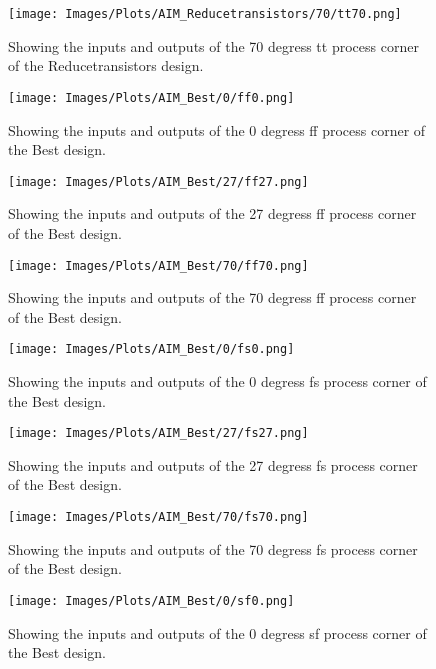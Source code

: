 \begin{figure}[htb] 
    \centering
    \texttt{[image: Images/Plots/AIM\_Reducetransistors/70/tt70.png]} 
    \caption{Showing the inputs and outputs of the 70 degress tt process corner of the Reducetransistors design.} 
    \label{fig:70ttReducetransistors} 
\end{figure}
\newline
\begin{figure}[htb] 
    \centering
    \texttt{[image: Images/Plots/AIM\_Best/0/ff0.png]} 
    \caption{Showing the inputs and outputs of the 0 degress ff process corner of the Best design.} 
    \label{fig:0ffBest} 
\end{figure}
\begin{figure}[htb] 
    \centering
    \texttt{[image: Images/Plots/AIM\_Best/27/ff27.png]} 
    \caption{Showing the inputs and outputs of the 27 degress ff process corner of the Best design.} 
    \label{fig:27ffBest} 
\end{figure}
\newline
\begin{figure}[htb] 
    \centering
    \texttt{[image: Images/Plots/AIM\_Best/70/ff70.png]} 
    \caption{Showing the inputs and outputs of the 70 degress ff process corner of the Best design.} 
    \label{fig:70ffBest} 
\end{figure}
\begin{figure}[htb] 
    \centering
    \texttt{[image: Images/Plots/AIM\_Best/0/fs0.png]} 
    \caption{Showing the inputs and outputs of the 0 degress fs process corner of the Best design.} 
    \label{fig:0fsBest} 
\end{figure}
\newline
\begin{figure}[htb] 
    \centering
    \texttt{[image: Images/Plots/AIM\_Best/27/fs27.png]} 
    \caption{Showing the inputs and outputs of the 27 degress fs process corner of the Best design.} 
    \label{fig:27fsBest} 
\end{figure}
\begin{figure}[htb] 
    \centering
    \texttt{[image: Images/Plots/AIM\_Best/70/fs70.png]} 
    \caption{Showing the inputs and outputs of the 70 degress fs process corner of the Best design.} 
    \label{fig:70fsBest} 
\end{figure}
\newline
\begin{figure}[htb] 
    \centering
    \texttt{[image: Images/Plots/AIM\_Best/0/sf0.png]} 
    \caption{Showing the inputs and outputs of the 0 degress sf process corner of the Best design.} 
    \label{fig:0sfBest} 
\end{figure}
